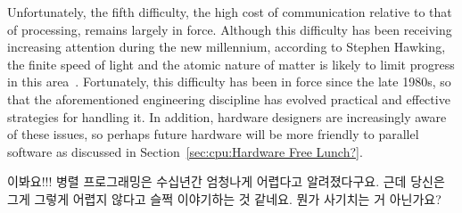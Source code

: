 Unfortunately, the fifth difficulty, the high cost of communication
relative to that of processing, remains largely in force.
Although this difficulty has been receiving increasing attention during
the new millennium, according to Stephen Hawking,
the finite speed of light and the atomic
nature of matter is likely to limit progress in this
area~\cite{BryanGardiner2007,GordonMoore03a}.
Fortunately, this difficulty has been in force since the late 1980s,
so that the aforementioned engineering discipline has evolved practical
and effective strategies for handling it.
In addition, hardware designers are increasingly aware of these issues,
so perhaps future hardware will be more friendly to parallel software
as discussed in Section~\ref{sec:cpu:Hardware Free Lunch?}.
\fi

\QuickQuiz{}
	이봐요!!!
	병렬 프로그래밍은 수십년간 엄청나게 어렵다고 알려졌다구요.
	근데 당신은 그게 그렇게 어렵지 않다고 슬쩍 이야기하는 것 같네요.
	뭔가 사기치는 거 아닌가요?
\iffalse

